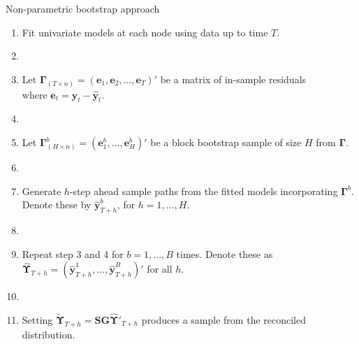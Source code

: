 \documentclass[11pt,xcolor=dvipsnames,handout]{beamer}
\newcounter{saveenumi}
\newcommand{\seti}{\setcounter{saveenumi}{\value{enumi}}}
\begin{document}


\begin{frame}{Non-parametric bootstrap approach}
\begin{enumerate}[<+-| alert@+>]
\item Fit univariate models at each node using data up to time $T$.
\item[]
\item Let $\bm{\Gamma}_{(T \times n)}=(\bm{e}_1,\bm{e}_2,\dots,\bm{e}_T)'$ be a matrix of in-sample residuals\\
where $\bm{e}_t=\bm{y}_t-\hat{\bm{y}}_t$. 
\item[]
\item Let $\bm{\Gamma}^b_{(H \times n)} = (\bm{e}^b_1,...,\bm{e}^b_H)'$ be a block bootstrap sample of size $H$ from $\bm{\Gamma}$.  
\item[]
\item Generate $h$-step ahead sample paths from the fitted models incorporating $\bm{\Gamma}^b$. Denote these by $\hat{\bm{y}}^b_{T+h}$, for $h=1,...,H$.

\item[]
\item  Repeat step 3 and 4 for $b = 1,...,B$ times. Denote these as $\hat{\bm{\Upsilon}}_{T+h}=(\hat{\bm{y}}^1_{T+h},...,\hat{\bm{y}}^B_{T+h})'$ for all $h$.
\item[]
\item Setting $\tilde{\bm{\Upsilon}}_{T+h} = \bm{SG}\hat{\bm{\Upsilon}}'_{T+h}$ produces a sample from the reconciled distribution.

\seti
\end{enumerate}
\end{frame}
%
%
\end{document}

